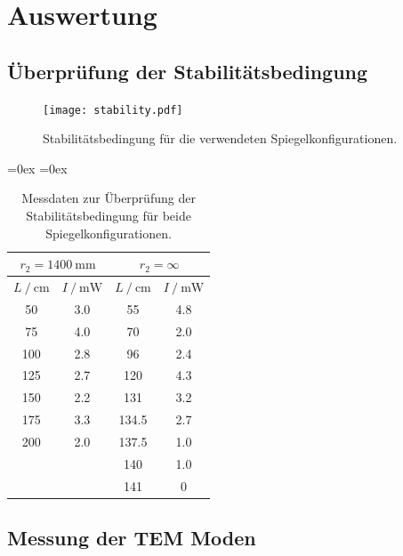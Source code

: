 \section{Auswertung}
\label{sec:Auswertung}

\subsection{Überprüfung der Stabilitätsbedingung}

\begin{figure}
  \centering
  \texttt{[image: stability.pdf]}
  \caption{Stabilitätsbedingung für die verwendeten Spiegelkonfigurationen.}
  \label{fig:stability}
\end{figure}

\begin{table}
  \centering
  \aboverulesep=0ex %
  \belowrulesep=0ex %
  \caption{Messdaten zur Überprüfung der Stabilitätsbedingung für beide Spiegelkonfigurationen.}
  \label{tab:stability}
  \begin{tabular}{S[table-format = 3.0] S[table-format = 1.1] | S[table-format = 3.1] S[table-format = 1.1]}
     &  \\
    \midrule
    \rule{0pt}{1.1EM}
    {$L \mathbin{/} \unit{\centi\metre}$} & {$I \mathbin{/} \unit{\milli\watt}$} & {$L \mathbin{/} \unit{\centi\metre}$} & {$I \mathbin{/} \unit{\milli\watt}$}\\
    \midrule
    \rule{0pt}{1.1EM}
     50 & 3.0 &    55 & 4.8 \\
     75 & 4.0 &    70 & 2.0 \\
    100 & 2.8 &    96 & 2.4 \\
    125 & 2.7 &   120 & 4.3 \\
    150 & 2.2 &   131 & 3.2 \\
    175 & 3.3 & 134.5 & 2.7 \\
    200 & 2.0 & 137.5 & 1.0 \\
        &     &   140 & 1.0 \\
        &     &   141 &   0 \\ 
  \end{tabular}
\end{table}

\subsection{Messung der TEM Moden}


